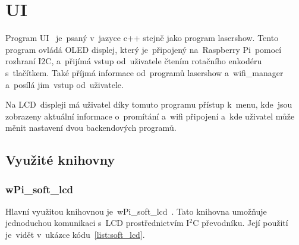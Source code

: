 \section{UI}
Program UI ~je~psaný v~jazyce c++ stejně jako program lasershow. Tento program ovládá OLED displej, který je~připojený na~Raspberry Pi~pomocí rozhraní I2C, a~přijímá vstup od~uživatele čtením rotačního enkodéru s~tlačítkem. Také příjmá informace od~programů lasershow a~wifi\_manager a~posílá jim~vstup od~uživatele.

Na LCD~displeji má uživatel díky tomuto programu přístup k~menu, kde~jsou zobrazeny aktuální informace o~promítání a~wifi připojení a~kde uživatel může měnit nastavení dvou backendových programů.


\subsection{Využité knihovny}
\subsubsection{wPi\_soft\_lcd}
Hlavní využitou knihovnou je~wPi\_soft\_lcd~\cite{wpi-lcd}. Tato knihovna umožňuje jednoduchou komunikaci s~LCD prostřednictvím I$^{2}$C převodníku. Její použití je~vidět v~ukázce kódu~\ref{list:soft_lcd}.

\begin{code}
    \inputminted[frame=lines,fontsize=\footnotesize{}, linenos, breaklines]{cpp}{code_examples/soft_lcd.cpp}
\end{code}

